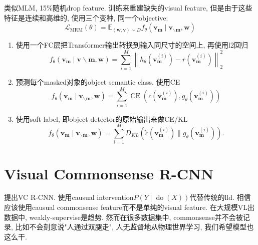 \documentclass{article}
\begin{document}
类似MLM, 15\%随机drop feature. 训练来重建缺失的visual feature, 但是由于这些特征是连续和高维的, 使用三个变种, 同一个objective:
\begin{equation}
    \mathcal{L}_{\mathrm{MRM}}(\theta)=\mathbb{E}_{(\mathbf{w}, \mathbf{v}) \sim D} f_{\theta}\left(\mathbf{v}_{\mathbf{m}} \mid \mathbf{v}_{\backslash \mathbf{m}}, \mathbf{w}\right)
\end{equation}
\begin{enumerate}
    \item {} 使用一个FC层把Transformer输出转换到输入同尺寸的空间上, 再使用l2回归
    \begin{equation}
        f_{\theta}\left(\mathbf{v}_{\mathbf{m}} \mid \mathbf{v} \backslash \mathbf{m}, \mathbf{w}\right)=\sum_{i=1}^{M}\left\|h_{\theta}\left(\mathbf{v}_{\mathbf{m}}^{(i)}\right)-r\left(\mathbf{v}_{\mathbf{m}}^{(i)}\right)\right\|_{2}^{2}
    \end{equation}
    \item {} 预测每个masked对象的object semantic class. 使用CE
    \begin{equation}
        f_{\theta}\left(\mathbf{v}_{\mathbf{m}} \mid \mathbf{v}_{\backslash \mathbf{m}}, \mathbf{w}\right)=\sum_{i=1}^{M} \operatorname{CE}\left(c\left(\mathbf{v}_{\mathbf{m}}^{(i)}\right), g_{\theta}\left(\mathbf{v}_{\mathbf{m}}^{(i)}\right)\right)
    \end{equation}
    \item {} 使用soft-label, 即object detector的原始输出来做CE/KL
    \begin{equation}
        f_{\theta}\left(\mathbf{v}_{\mathbf{m}} \mid \mathbf{v}_{\backslash \mathbf{m}}, \mathbf{w}\right)=\sum_{i=1}^{M} D_{K L}\left(\tilde{c}\left(\mathbf{v}_{\mathbf{m}}^{(i)}\right) \| g_{\theta}\left(\mathbf{v}_{\mathbf{m}}^{(i)}\right)\right) .
    \end{equation}
\end{enumerate}

\section{Visual Commonsense R-CNN}

提出VC R-CNN. 使用causual intervention$P(Y \mid \operatorname{do}(X))$代替传统的lld. 相信应该使用causual commonsense feature而不是单纯的visual feature. 在大规模VL出数据中, weakly-supervise是趋势. 然而在很多数据集中, commonsense并不会被记录, 比如不会刻意说"人通过双腿走", 人无监督地从物理世界学习, 我们希望模型也这么干.
\end{document}
